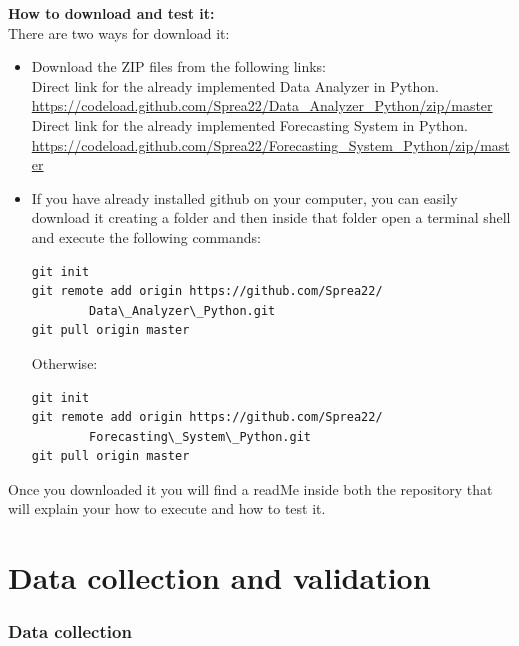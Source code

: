 \textbf{How to download and test it:}\\
There are two ways for download it:
\begin{itemize}
\item Download the ZIP files from the following links:\\

Direct link for the already implemented Data Analyzer in Python.\\
\url{https://codeload.github.com/Sprea22/Data_Analyzer_Python/zip/master}\\

Direct link for the already implemented Forecasting System in Python.\\
\url{https://codeload.github.com/Sprea22/Forecasting_System_Python/zip/master}

\newpage
\item If you have already installed github on your computer, you can easily download it creating a folder and then inside that folder open a terminal shell and execute the following commands:\\
\begin{lstlisting}
git init
git remote add origin https://github.com/Sprea22/
		Data\_Analyzer\_Python.git
git pull origin master
\end{lstlisting}

Otherwise:\\

\begin{lstlisting}
git init
git remote add origin https://github.com/Sprea22/
		Forecasting\_System\_Python.git
git pull origin master
\end{lstlisting}
\end{itemize}

Once you downloaded it you will find a readMe inside both the repository that will explain your how to execute and how to test it.

\part{Data collection and validation}
\newpage
\section{Data collection}
